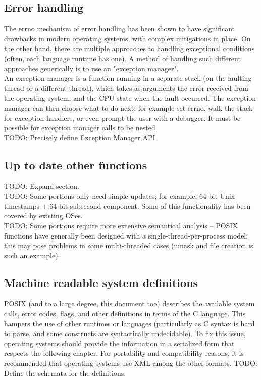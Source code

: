 \subsection{Error handling}
The errno mechanism of error handling has been shown to have significant drawbacks in modern operating systems, with complex mitigations in place. On the other hand, there are multiple approaches to handling exceptional conditions (often, each language runtime has one). A method of handling such different approaches generically is to use an "exception manager".\\
An exception manager is a function running in a separate stack (on the faulting thread or a different thread), which takes as arguments the error received from the operating system, and the CPU state when the fault occurred. The exception manager can then choose what to do next; for example set errno, walk the stack for exception handlers, or even prompt the user with a debugger. It must be possible for exception manager calls to be nested.\\
TODO: Precisely define Exception Manager API
\subsection{Up to date other functions}
TODO: Expand section.\\
TODO: Some portions only need simple updates; for example, 64-bit Unix timestamps + 64-bit subsecond component. Some of this functionality has been covered by existing OSes.\\
TODO: Some portions require more extensive semantical analysis -- POSIX functions have generally been designed with a single-thread-per-process model; this may pose problems in some multi-threaded cases (umask and file creation is such an example).
\subsection{Machine readable system definitions}
POSIX (and to a large degree, this document too) describes the available system calls, error codes, flags, and other definitions in terms of the C language. This hampers the use of other runtimes or languages (particularly as C syntax is hard to parse, and some constructs are syntactically undecidable). To fix this issue, operating systems should provide the information in a serialized form that respects the following chapter. For portability and compatibility reasons, it is recommended that operating systems use XML among the other formats.
TODO: Define the schemata for the definitions.
